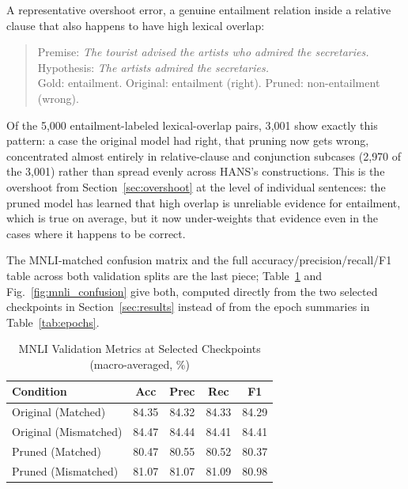 \documentclass[conference]{IEEEtran}
\begin{document}
A representative overshoot error, a genuine entailment relation inside a relative clause that also happens to have high lexical overlap:
\begin{quote}
\small
Premise: \textit{The tourist advised the artists who admired the secretaries.}\\
Hypothesis: \textit{The artists admired the secretaries.}\\
Gold: entailment. Original: entailment (right). Pruned: non-entailment (wrong).
\end{quote}

Of the 5{,}000 entailment-labeled lexical-overlap pairs, 3{,}001 show exactly this pattern: a case the original model had right, that pruning now gets wrong, concentrated almost entirely in relative-clause and conjunction subcases (2{,}970 of the 3{,}001) rather than spread evenly across HANS's constructions. This is the overshoot from Section~\ref{sec:overshoot} at the level of individual sentences: the pruned model has learned that high overlap is unreliable evidence for entailment, which is true on average, but it now under-weights that evidence even in the cases where it happens to be correct.

The MNLI-matched confusion matrix and the full accuracy/precision/recall/F1 table across both validation splits are the last piece; Table~\ref{tab:mnli_metrics} and Fig.~\ref{fig:mnli_confusion} give both, computed directly from the two selected checkpoints in Section~\ref{sec:results} instead of from the epoch summaries in Table~\ref{tab:epochs}.

\begin{table}[htbp]
\caption{MNLI Validation Metrics at Selected Checkpoints (macro-averaged, \%)}
\label{tab:mnli_metrics}
\centering
\renewcommand{\arraystretch}{1.2}
\setlength{\tabcolsep}{4pt}
\small
\begin{tabular}{@{}lcccc@{}}
\toprule
\textbf{Condition} & \textbf{Acc} & \textbf{Prec} & \textbf{Rec} & \textbf{F1} \\
\midrule
Original (Matched)    & 84.35 & 84.32 & 84.33 & 84.29 \\
Original (Mismatched) & 84.47 & 84.44 & 84.41 & 84.41 \\
Pruned (Matched)       & 80.47 & 80.55 & 80.52 & 80.37 \\
Pruned (Mismatched)    & 81.07 & 81.07 & 81.09 & 80.98 \\
\bottomrule
\end{tabular}
\end{table}
\end{document}
